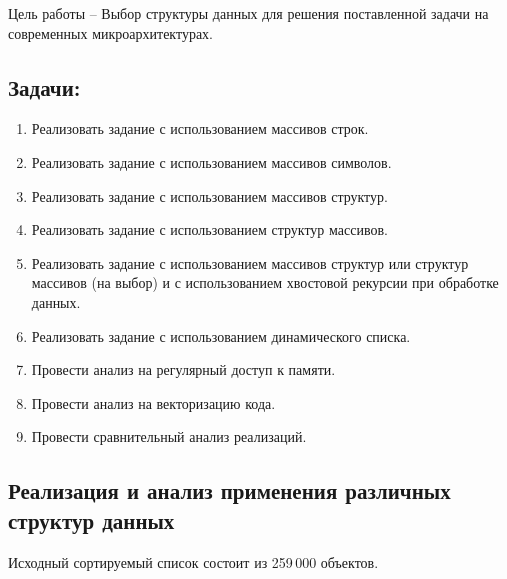 \documentclass[a4paper, 12pt] {article}
\begin{document}
Цель работы -- Выбор структуры данных для решения поставленной задачи
на современных микроархитектурах.
\subsection*{Задачи:}
\begin{enumerate}
  \item Реализовать задание с использованием массивов строк.
  \item Реализовать задание с использованием массивов символов.
  \item Реализовать задание с использованием массивов структур.
  \item Реализовать задание с использованием структур массивов.
  \item Реализовать задание с использованием массивов структур или
    структур массивов (на выбор) и с использованием хвостовой рекурсии при обработке данных.
  \item Реализовать задание с использованием динамического списка.
  \item Провести анализ на регулярный доступ к памяти.
  \item Провести анализ на векторизацию кода.
  \item Провести сравнительный анализ реализаций.
\end{enumerate}

\newpage
\begin{center}
  \section{Реализация и анализ применения различных структур данных}
\end{center}

  Исходный сортируемый список состоит из 259\,000 объектов.\medskip
\end{document}
